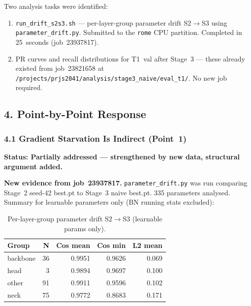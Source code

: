 \noindent Two analysis tasks were identified:
\begin{enumerate}
    \item \texttt{run\_drift\_s2s3.sh} --- per-layer-group parameter drift
    S2$\to$S3 using \texttt{parameter\_drift.py}. Submitted to the \texttt{rome}
    CPU partition. Completed in 25~seconds (job~23937817).
    \item PR curves and recall distributions for T1~val after Stage~3 ---
    these already existed from job~23821658 at
    \texttt{/projects/prjs2041/analysis/stage3\_naive/eval\_t1/}.
    No new job required.
\end{enumerate}

\subsection*{4. Point-by-Point Response}

\subsubsection*{4.1 Gradient Starvation Is Indirect (Point~1)}

\textbf{Status: Partially addressed --- strengthened by new data, structural
argument added.}

\vspace{0.5em}
\noindent\textbf{New evidence from job~23937817.} \texttt{parameter\_drift.py}
was run comparing Stage~2 seed-42 best.pt to Stage~3 naive best.pt. 335 parameters
analysed. Summary for learnable parameters only (BN running stats excluded):

\begin{table}[h]
\centering
\caption{Per-layer-group parameter drift S2$\to$S3 (learnable params only).}
\small
\begin{tabular}{lrrrr}
\hline
\textbf{Group} & \textbf{N} & \textbf{Cos mean} & \textbf{Cos min} & \textbf{L2 mean} \\
\hline
backbone & 36 & 0.9951 & 0.9626 & 0.069 \\
head     &  3 & 0.9894 & 0.9697 & 0.100 \\
other    & 91 & 0.9911 & 0.9596 & 0.102 \\
neck     & 75 & 0.9772 & 0.8683 & 0.171 \\
\hline
\end{tabular}
\end{table}


